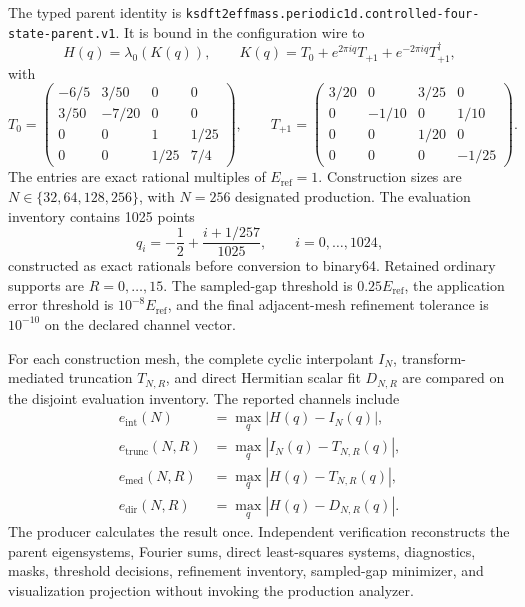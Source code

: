 \documentclass[11pt]{article}
\begin{document}
The typed parent identity is
\texttt{ksdft2effmass.periodic1d.controlled-four-state-parent.v1}.  It is bound in the
configuration wire to
\begin{equation}
 H(q)=\lambda_0(K(q)),\qquad
 K(q)=T_0+e^{2\pi iq}T_{+1}+e^{-2\pi iq}T_{+1}^{\dagger},
\end{equation}
with
\begin{equation}
T_0=\begin{pmatrix}
-6/5&3/50&0&0\\3/50&-7/20&0&0\\
0&0&1&1/25\\0&0&1/25&7/4
\end{pmatrix},\qquad
T_{+1}=\begin{pmatrix}
3/20&0&3/25&0\\0&-1/10&0&1/10\\
0&0&1/20&0\\0&0&0&-1/25
\end{pmatrix}.
\end{equation}
The entries are exact rational multiples of $E_{\mathrm{ref}}=1$.  Construction sizes
are $N\in\{32,64,128,256\}$, with $N=256$ designated production.  The evaluation
inventory contains 1025 points
\begin{equation}
 q_i=-\frac12+\frac{i+1/257}{1025},\qquad i=0,\ldots,1024,
\end{equation}
constructed as exact rationals before conversion to binary64.  Retained ordinary
supports are $R=0,\ldots,15$.  The sampled-gap threshold is
$0.25E_{\mathrm{ref}}$, the application error threshold is
$10^{-8}E_{\mathrm{ref}}$, and the final adjacent-mesh refinement tolerance is
$10^{-10}$ on the declared channel vector.

For each construction mesh, the complete cyclic interpolant $I_N$, transform-mediated
truncation $T_{N,R}$, and direct Hermitian scalar fit $D_{N,R}$ are compared on the
disjoint evaluation inventory.  The reported channels include
\begin{align}
 e_{\mathrm{int}}(N)&=\max_q |H(q)-I_N(q)|,\\
 e_{\mathrm{trunc}}(N,R)&=\max_q |I_N(q)-T_{N,R}(q)|,\\
 e_{\mathrm{med}}(N,R)&=\max_q |H(q)-T_{N,R}(q)|,\\
 e_{\mathrm{dir}}(N,R)&=\max_q |H(q)-D_{N,R}(q)|.
\end{align}
The producer calculates the result once.  Independent verification reconstructs the
parent eigensystems, Fourier sums, direct least-squares systems, diagnostics, masks,
threshold decisions, refinement inventory, sampled-gap minimizer, and visualization
projection without invoking the production analyzer.
\end{document}
